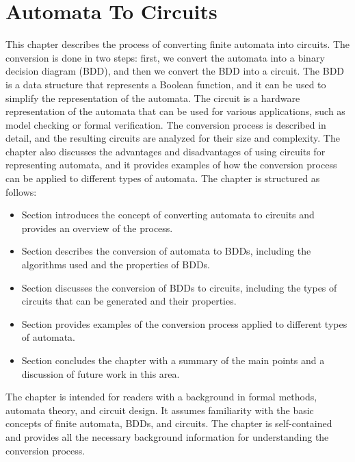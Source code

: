 \chapter{Automata To Circuits}
\label{chap:automata-to-circuits}

This chapter describes the process of converting finite automata into circuits. The conversion is done in two steps: first, we convert the automata into a binary decision diagram (BDD), and then we convert the BDD into a circuit. The BDD is a data structure that represents a Boolean function, and it can be used to simplify the representation of the automata. The circuit is a hardware representation of the automata that can be used for various applications, such as model checking or formal verification.
The conversion process is described in detail, and the resulting circuits are analyzed for their size and complexity. The chapter also discusses the advantages and disadvantages of using circuits for representing automata, and it provides examples of how the conversion process can be applied to different types of automata.
The chapter is structured as follows:
\begin{itemize}
    \item Section introduces the concept of converting automata to circuits and provides an overview of the process.
    \item Section describes the conversion of automata to BDDs, including the algorithms used and the properties of BDDs.
    \item Section discusses the conversion of BDDs to circuits, including the types of circuits that can be generated and their properties.
    \item Section provides examples of the conversion process applied to different types of automata.
    \item Section concludes the chapter with a summary of the main points and a discussion of future work in this area.
\end{itemize}
The chapter is intended for readers with a background in formal methods, automata theory, and circuit design. It assumes familiarity with the basic concepts of finite automata, BDDs, and circuits. The chapter is self-contained and provides all the necessary background information for understanding the conversion process.



